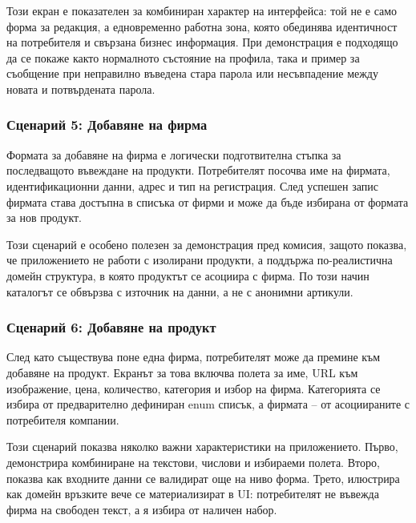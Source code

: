 Този екран е показателен за комбиниран характер на интерфейса: той не е само форма за редакция, а едновременно работна зона, която обединява идентичност на потребителя и свързана бизнес информация. При демонстрация е подходящо да се покаже както нормалното състояние на профила, така и пример за съобщение при неправилно въведена стара парола или несъвпадение между новата и потвърдената парола.


\subsubsection{Сценарий 5: Добавяне на фирма}

Формата за добавяне на фирма е логически подготвителна стъпка за последващото въвеждане на продукти. Потребителят посочва име на фирмата, идентификационни данни, адрес и тип на регистрация. След успешен запис фирмата става достъпна в списъка от фирми и може да бъде избирана от формата за нов продукт.

Този сценарий е особено полезен за демонстрация пред комисия, защото показва, че приложението не работи с изолирани продукти, а поддържа по-реалистична домейн структура, в която продуктът се асоциира с фирма. По този начин каталогът се обвързва с източник на данни, а не с анонимни артикули.


\subsubsection{Сценарий 6: Добавяне на продукт}

След като съществува поне една фирма, потребителят може да премине към добавяне на продукт. Екранът за това включва полета за име, URL към изображение, цена, количество, категория и избор на фирма. Категорията се избира от предварително дефиниран enum списък, а фирмата -- от асоциираните с потребителя компании.

Този сценарий показва няколко важни характеристики на приложението. Първо, демонстрира комбиниране на текстови, числови и избираеми полета. Второ, показва как входните данни се валидират още на ниво форма. Трето, илюстрира как домейн връзките вече се материализират в UI: потребителят не въвежда фирма на свободен текст, а я избира от наличен набор.


